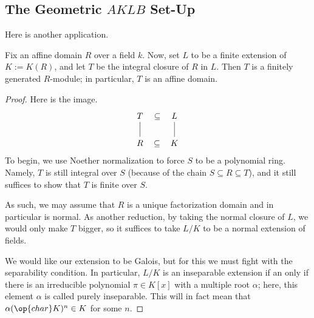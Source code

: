 \documentclass[../notes.tex]{subfiles}
\begin{document}
\subsection{The Geometric \texorpdfstring{$AKLB$}{AKLB} Set-Up}
Here is another application.
\begin{proposition} \label{prop:geometricaklb}
	Fix an affine domain $R$ over a field $k$. Now, set $L$ to be a finite extension of $K:=K(R)$, and let $T$ be the integral closure of $R$ in $L$. Then $T$ is a finitely generated $R$-module; in particular, $T$ is an affine domain.
\end{proposition}
\begin{proof}
	Here is the image.
	\[\begin{tikzcd}
		T & L \\
		R & K
		\arrow[no head, from=2-1, to=1-1]
		\arrow[no head, from=2-2, to=1-2]
		\arrow["\subseteq"{marking}, draw=none, from=2-1, to=2-2]
		\arrow["\subseteq"{marking}, draw=none, from=1-1, to=1-2]
	\end{tikzcd}\]
	To begin, we use Noether normalization to force $S$ to be a polynomial ring. Namely, $T$ is still integral over $S$ (because of the chain $S\subseteq R\subseteq T$), and it still suffices to show that $T$ is finite over $S$.

	As such, we may assume that $R$ is a unique factorization domain and in particular is normal. As another reduction, by taking the normal closure of $L$, we would only make $T$ bigger, so it suffices to take $L/K$ to be a normal extension of fields.

	We would like our extension to be Galois, but for this we must fight with the separability condition. In particular, $L/K$ is an inseparable extension if an only if there is an irreducible polynomial $\pi\in K[x]$ with a multiple root $\alpha$; here, this element $\alpha$ is called purely inseparable. This will in fact mean that $\alpha{(\op{char}K)^n}\in K$ for some $n$.


\end{proof}
\end{document}
